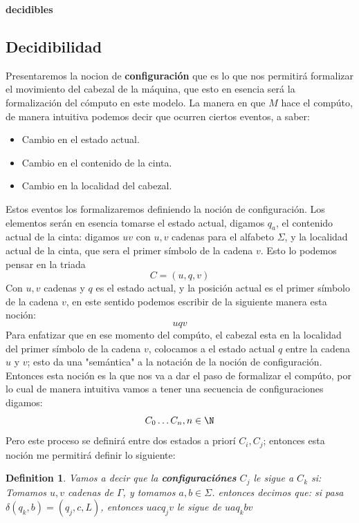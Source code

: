 \documentclass[10pt]{report}
\newtheorem{definition}{Definition}
\begin{document}
{    \textbf{decidibles}
    \subsection{Decidibilidad}\label{subsec:decidibilidad2}
    Presentaremos la nocion de \textbf{configuración} que es lo que nos permitirá formalizar el movimiento del
    cabezal de la máquina, que esto en esencia será la formalización del cómputo en este modelo.
    \newline
    La manera en que $M$ hace el compúto, de manera intuitiva podemos decir que ocurren ciertos eventos, a saber:
    \begin{itemize}
        \item Cambio en el estado actual.
        \item Cambio en el contenido de la cinta.
        \item Cambio en la localidad del cabezal.
    \end{itemize}
    Estos eventos los formalizaremos definiendo la noción de configuración.
    Los elementos serán en esencia tomarse el estado actual, digamos $q_{a}$, el contenido actual de la cinta:
    digamos $uv$ con $u,v$ cadenas para el alfabeto $\Sigma$, y la localidad actual de la cinta, que sera el primer
    símbolo de la cadena $v$. \newline
    Esto lo podemos pensar en la triada
    \begin{equation}
        C = (u,q,v)
    \end{equation}
    Con $u,v$ cadenas y $q$ es el estado actual, y la posición actual es el primer símbolo de la cadena $v$,
    en este sentido podemos escribir de la siguiente manera esta noción:
    \begin{equation}
        uqv
    \end{equation}
    Para enfatizar que en ese momento del compúto, el cabezal esta en la localidad del primer símbolo de la cadena
    $v$, colocamos a el estado actual $q$ entre la cadena $u$ y $v$; esto da una "semántica" a la notación de la noción
    de configuración.
    \newspace
    Entonces esta noción es la que nos va a dar el paso de formalizar el compúto, por lo cual de manera intuitiva
    vamos a tener una secuencia de configuraciones digamos:
    \begin{equation}
        C_{0}\mathellipsis C_{n}, n\in \N
    \end{equation}
    Pero este proceso se definirá entre dos estados a priorí $C_{i},C_{j}$;
    entonces esta noción me permitirá definir lo siguiente:
    \begin{definition}
        Vamos a decir que la \textbf{configuraciónes} $C_{j}$ le sigue a $C_{k}$ si:
        Tomamos $u,v$ cadenas de $\Gamma$, y tomamos $a,b\in \Sigma$.
        entonces decimos que: si pasa $\delta(q_{k},b) = (q_{j},c,L)$,
        entonces $uacq_{j}v$ le sigue de $uaq_{k}bv$


\end{definition}}
\end{document}
